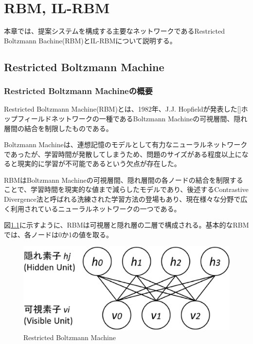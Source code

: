 \chapter{RBM, IL-RBM}
本章では、提案システムを構成する主要なネットワークであるRestricted Boltzmann Bachine(RBM)とIL-RBMについて説明する。

\section{Restricted Boltzmann Machine}
\subsection{Restricted Boltzmann Machineの概要}
Restricted Boltzmann Machine(RBM)とは、1982年、J.J. Hopfieldが発表した[]ホップフィールドネットワークの一種であるBoltzmann Machineの可視層間、隠れ層間の結合を制限したものである。
 
Boltzmann Machineは、連想記憶のモデルとして有力なニューラルネットワークであったが、学習時間が発散してしまうため、問題のサイズがある程度以上になると現実的に学習が不可能であるという欠点が存在した。

RBMはBoltzmann Machineの可視層間、隠れ層間の各ノードの結合を制限することで、学習時間を現実的な値まで減らしたモデルであり、後述するContrastive Divergence法と呼ばれる洗練された学習方法の登場もあり、現在様々な分野で広く利用されているニューラルネットワークの一つである。


図\ref{fig:rbm}に示すように、RBMは可視層と隠れ層の二層で構成される。基本的なRBMでは、各ノードは0か1の値を取る。

\begin{figure}[tb]
 \begin{center}
  \includegraphics[scale=0.4]{./img_dl/rbm.eps}
  \caption{Restricted Boltzmann Machine}
  \label{fig:rbm}
 \end{center}
\end{figure}


